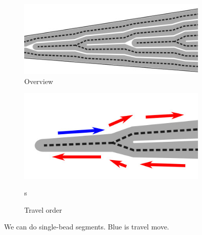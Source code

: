 \begin{figure}
\begin{subfigure}{0.45\columnwidth}
\includegraphics[width=\columnwidth]{sources/method/single_bead_strategy.jpg}
\caption{Overview}
\label{single_bead_strategy_overview}
\end{subfigure}
\begin{subfigure}{0.45\columnwidth}
\includegraphics[width=\columnwidth]{sources/method/single_bead_strategy_order.jpg}
\caption{Travel order}s
\end{subfigure}
\caption{We can do single-bead segments. Blue is travel move.}
\label{single_bead_strategy}
\end{figure}

